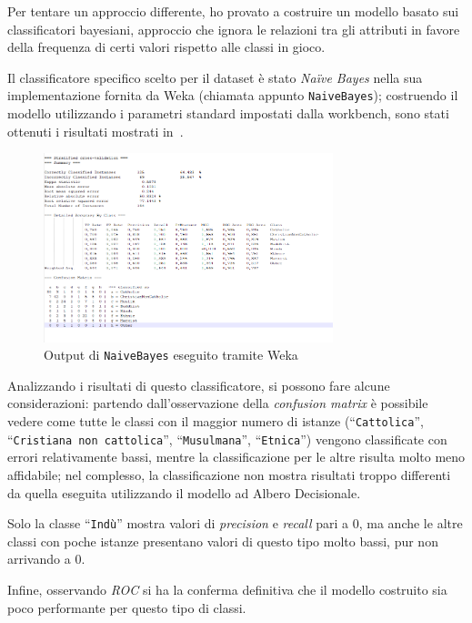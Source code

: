\documentclass[a4paper,11pt,twoside,notitlepage,final]{scrartcl}
\begin{document}
Per tentare un approccio differente, ho provato a costruire un modello basato sui classificatori bayesiani,
approccio che ignora le relazioni tra gli attributi in favore della frequenza di certi valori rispetto alle classi in gioco.

Il classificatore specifico scelto per il dataset è stato \emph{Naïve Bayes} nella sua implementazione fornita da Weka (chiamata appunto \texttt{NaiveBayes});
costruendo il modello utilizzando i parametri standard impostati dalla workbench, sono stati ottenuti i risultati mostrati in~.


\begin{figure}[H]
  \centering
  \includegraphics[width=0.75\textwidth]{fig/bayes.PNG}%
  \caption{Output di \texttt{NaiveBayes} eseguito tramite Weka}%
  \label{fig:bayes}
\end{figure}

Analizzando i risultati di questo classificatore, si possono fare alcune considerazioni:
partendo dall'osservazione della \emph{confusion matrix} è possibile vedere come tutte le classi con il maggior numero di istanze (``\texttt{Cattolica}'', ``\texttt{Cristiana non cattolica}'', ``\texttt{Musulmana}'', ``\texttt{Etnica}'')
vengono classificate con errori relativamente bassi, mentre la classificazione per le altre risulta molto meno affidabile; nel complesso, la classificazione non mostra risultati troppo differenti da quella eseguita utilizzando il modello ad Albero Decisionale.

Solo la classe ``\texttt{Indù}'' mostra valori di \emph{precision} e \emph{recall} pari a \(0\), ma anche le altre classi con poche istanze presentano valori di questo tipo molto bassi, pur non arrivando a \(0\).

Infine, osservando \emph{ROC} si ha la conferma definitiva che il modello costruito sia poco performante per questo tipo di classi.
\end{document}
